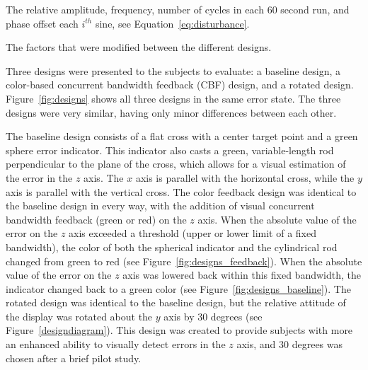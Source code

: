 \begin{table}[tb]
    \centering
    \caption[Disturbance force characteristics]{The relative amplitude, frequency, number of cycles in each 60 second run, and phase offset each $i^{th}$ sine, see Equation~\ref{eq:disturbance}.}
    \label{sine-table}
\end{table}

\begin{table}[tb]
    \centering
    \caption[The factors that were modified between the different designs]{The factors that were modified between the different designs.}
    \label{tab:designs}
\end{table}

Three designs were presented to the subjects to evaluate: a baseline design, a color-based concurrent bandwidth feedback (CBF) design, and a rotated design.
Figure~\ref{fig:designs} shows all three designs in the same error state.
The three designs were very similar, having only minor differences between each other.

The baseline design consists of a flat cross with a center target point and a green sphere error indicator.
This indicator also casts a green, variable-length rod perpendicular to the plane of the cross, which allows for a visual estimation of the error in the $z$ axis.
The $x$ axis is parallel with the horizontal cross, while the $y$ axis is parallel with the vertical cross.
The color feedback design was identical to the baseline design in every way, with the addition of visual concurrent bandwidth feedback (green or red) on the $z$ axis.
When the absolute value of the error on the $z$ axis exceeded a threshold (upper or lower limit of a fixed bandwidth), the color of both the spherical indicator and the cylindrical rod changed from green to red (see Figure~\ref{fig:designs_feedback}).
When the absolute value of the error on the $z$ axis was lowered back within this fixed bandwidth, the indicator changed back to a green color (see Figure~\ref{fig:designs_baseline}).
The rotated design was identical to the baseline design, but the relative attitude of the display was rotated about the $y$ axis by 30 degrees (see Figure~\ref{designdiagram}).
This design was created to provide subjects with more an enhanced ability to visually detect errors in the $z$ axis, and 30 degrees was chosen after a brief pilot study.

